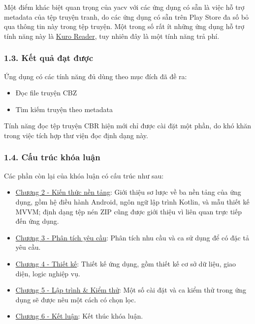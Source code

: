\documentclass[
]{article}
\begin{document}
Một điểm khác biệt quan trọng của yacv với các ứng dụng có sẵn là việc
hỗ trợ metadata của tệp truyện tranh, do các ứng dụng có sẵn trên Play
Store đa số bỏ qua thông tin này trong tệp truyện. Một trong số rất ít
những ứng dụng hỗ trợ tính năng này là
\href{https://play.google.com/store/apps/details?id=br.com.kurotoshiro.leitor_manga\&hl=en\&gl=US}{Kuro
Reader}, tuy nhiên đây là một tính năng trả phí.

\hypertarget{kux1ebft-quux1ea3-ux111ux1ea1t-ux111ux1b0ux1ee3c}{%
\subsubsection{\texorpdfstring{1.3. Kết quả đạt được
}{1.3. Kết quả đạt được }}\label{kux1ebft-quux1ea3-ux111ux1ea1t-ux111ux1b0ux1ee3c}}

Ứng dụng có các tính năng đủ dùng theo mục đích đã đề ra:

\begin{itemize}
\item
  Đọc file truyện CBZ
\item
  Tìm kiếm truyện theo metadata
\end{itemize}

Tính năng đọc tệp truyện CBR hiện mới chỉ được cài đặt một phần, do khó
khăn trong việc tích hợp thư viện đọc định dạng này.

\hypertarget{cux1ea5u-truxfac-khuxf3a-luux1eadn}{%
\subsubsection{\texorpdfstring{1.4. Cấu trúc khóa luận
}{1.4. Cấu trúc khóa luận }}\label{cux1ea5u-truxfac-khuxf3a-luux1eadn}}

Các phần còn lại của khóa luận có cấu trúc như sau:

\begin{itemize}
\item
  \protect\hyperlink{P2-fundamental}{Chương 2 - Kiến thức nền tảng}:
  Giới thiệu sơ lược về ba nền tảng của ứng dụng, gồm hệ điều hành
  Android, ngôn ngữ lập trình Kotlin, và mẫu thiết kế MVVM; định dạng
  tệp nén ZIP cũng được giới thiệu vì liên quan trực tiếp đến ứng dụng.
\item
  \protect\hyperlink{P3-requirements}{Chương 3 - Phân tích yêu cầu}:
  Phân tích nhu cầu và ca sử dụng để có đặc tả yêu cầu.
\item
  \protect\hyperlink{P4-design}{Chương 4 - Thiết kế}: Thiết kế ứng dụng,
  gồm thiết kế cơ sở dữ liệu, giao diện, logic nghiệp vụ.
\item
  \protect\hyperlink{P5-implementation}{Chương 5 - Lập trình \& Kiểm
  thử}: Một số cài đặt và ca kiểm thử trong ứng dụng sẽ được nêu một
  cách có chọn lọc.
\item
  \protect\hyperlink{P6-comclusion}{Chương 6 - Kết luận}: Kết thúc khóa
  luận.
\end{itemize}
\end{document}

